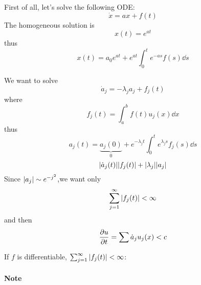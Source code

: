 First of all, let's solve the following ODE:
$$\dot{x} = ax + f(t)$$
The homogeneous solution is
$$x(t) = e^{at}$$
thus
$$x(t) = a_0 e^{at} +e^{at} \int_0^t e^{-as} f(s) \dd{s}$$


We want to solve
$$\dot{a}_j = -\lambda_j a_j + f_j(t)$$
where
$$f_j(t) = \int_a^b f(t) u_j(x) \dd{x}$$
thus
$$a_j(t) = \underbrace{a_j(0)}_{0} + e^{-\lambda_j t} \int_0^t e^{\lambda_j s} f_j(s) \dd{s}$$
$$\abs{ \dot{a}_j(t)} \abs{f_j(t)} + \abs{ \lambda_j} \abs{a_j}$$
Since $\abs{a_j} \sim e^{-j^2}$,we want only
$$\sum_{j=1}^\infty \abs{f_j(t)} < \infty$$
and then
$$\pdv{u}{t} = \sum \dot{a}_j u_j(x) < c$$

If $f$ is differentiable, $\sum_{j=1}^\infty \abs{f_j(t)} < \infty$:
\paragraph{Note}